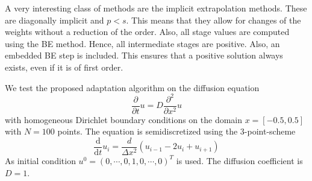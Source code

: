 \documentclass[a4paper]{article}
\numberwithin{equation}{section}
\theoremstyle{plain}
\theoremstyle{definition}
\numberwithin{theorem}{section}
\newcommand{\1}{\mathbbm{1}}
\begin{document}
A very interesting class of methods are the implicit extrapolation methods. These are diagonally implicit and $p < s$. This means that they allow for changes of the weights without a reduction of the order.
Also, all stage values are computed using the BE method. Hence, all intermediate stages are positive.
Also, an embedded BE step is included. This ensures that a positive solution always exists, even if it is of first order.

We test the proposed adaptation algorithm on the diffusion equation
\begin{equation}
\frac{\partial }{\partial t} u = D \frac{\partial^2}{\partial x^2} u
\end{equation}
with homogeneous Dirichlet boundary conditions on the domain $x = [-0.5,0.5]$ with $N=100$ points. The equation is semidiscretized using the 3-point-scheme
\begin{equation}
\frac{\mathrm d}{\mathrm d t} u_i = \frac{d}{\Delta x^2} \left( u_{i-1} - 2u_i + u_{i+1} \right)
\end{equation}
As initial condition $u^0 = (0,\cdots,0,1,0,\cdots,0)^T$ is used. The diffusion coefficient is $D=1$.
\end{document}
